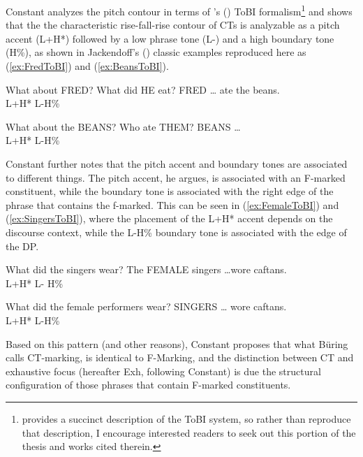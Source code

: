 \documentclass[
	letterpaper,
]{article}
\begin{document}
Constant analyzes the pitch contour in terms of \citeauthor{pierrehumbert1990meaning}'s (\citeyear{pierrehumbert1990meaning}) ToBI formalism\footnote{\textcite[14--16]{constant2014diss} provides a succinct description of the ToBI system, so rather than reproduce that description, I encourage interested readers to seek out this portion of the thesis and works cited therein.} and shows that the the characteristic rise-fall-rise contour of CTs is analyzable as a pitch accent (L+H*) followed by a low phrase tone (L-) and a high boundary tone (H\%), as shown in Jackendoff's (\citeyear{jackendoff1972semantics}) classic examples reproduced here as (\ref{ex:FredToBI}) and (\ref{ex:BeansToBI}).
\begin{exe}
\ex\label{ex:FredToBI}
\begin{xlist}
	 What about FRED? What did HE eat?
	\gll FRED {\ldots} {ate the beans.}\\
	L+H* L-H\% {}\\
\end{xlist}
\ex\label{ex:BeansToBI}
\begin{xlist}
 What about the BEANS? Who ate THEM?
 BEANS \ldots\\
{} L+H* L-H\%\\	
\end{xlist}	
\end{exe}

Constant further notes that the pitch accent and boundary tones are associated to different things.
The pitch accent, he argues, is associated with an F-marked constituent, while the boundary tone is associated with the right edge of the phrase that contains the f-marked.
This can be seen in (\ref{ex:FemaleToBI}) and (\ref{ex:SingersToBI}), where the placement of the L+H* accent depends on the discourse context, while the L-H\% boundary tone is associated with the edge of the DP.
\begin{exe}
\ex\label{ex:FemaleToBI}
\begin{xlist}
	 What did the singers wear?
	\gll The {\hspace{1em}FEMALE} singers \ldots {wore caftans.}\\
	{} L+H* {\hspace{2em}L-} H\% {}\\
\end{xlist}
\ex\label{ex:SingersToBI}
\begin{xlist}
	 What did the female performers wear?
	 {\hspace{1em}SINGERS} {\hspace{1em}\ldots} {wore caftans.}\\
	{} L+H* L-H\% {}\\	
\end{xlist}	
\end{exe}
Based on this pattern (and other reasons), Constant proposes that what B\"uring calls CT-marking, is identical to F-Marking, and the distinction between CT and exhaustive focus (hereafter Exh, following Constant) is due the structural configuration of those phrases that contain F-marked constituents.
\end{document}
